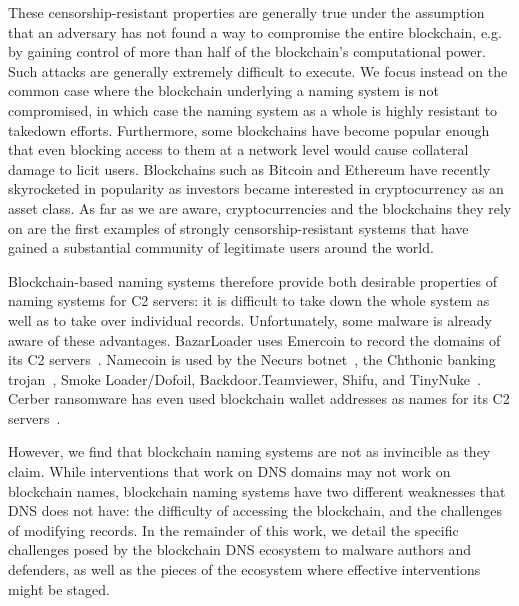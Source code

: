 These censorship-resistant properties are generally true under the assumption 
that an adversary has not found a way to compromise the entire blockchain, e.g. 
by gaining control of more than half of the blockchain's 
computational power. Such attacks are generally extremely 
difficult to execute. We focus instead on the 
common case where the blockchain underlying a naming system is not compromised, 
in which case the naming system as a whole is highly resistant to takedown 
efforts. Furthermore, some blockchains have become popular enough that even 
blocking access to them at a network level would cause collateral damage to 
licit users. Blockchains such as Bitcoin and Ethereum have recently 
skyrocketed in popularity as investors became interested in cryptocurrency as 
an asset class. As far as we are aware, cryptocurrencies and the blockchains 
they rely on are the first examples of strongly censorship-resistant systems 
that have gained a substantial community of legitimate users around the world.

Blockchain-based naming systems therefore provide both desirable properties of 
naming systems for C2 servers: it is difficult to take down the whole system as 
well as to take over individual records. Unfortunately, some malware is already 
aware of these advantages. BazarLoader uses Emercoin 
to record the domains of its C2 servers~\cite{brandt_bazarloader_2021}. 
Namecoin is used by the Necurs botnet~\cite{dgas_of_necurs}, the 
Chthonic banking trojan~\cite{malware_traffic_analysis_2016}, Smoke 
Loader/Dofoil, Backdoor.Teamviewer, Shifu, and TinyNuke~\cite{abusech_2017, 
mackie_cryptodns_2018}. Cerber ransomware has 
even used blockchain wallet addresses as names for its C2 
servers~\cite{pletinckx_malware_2018}.

However, we find that blockchain naming systems are not as invincible as they 
claim. While interventions that work on DNS domains may not work on blockchain 
names, blockchain naming systems have two different 
weaknesses that DNS does not have: the difficulty of accessing the blockchain,  
and the challenges of modifying records. In the remainder of this work, we 
detail the specific challenges posed by the blockchain DNS ecosystem to malware 
authors and defenders, as well as the pieces of the ecosystem where 
effective interventions might be staged.

